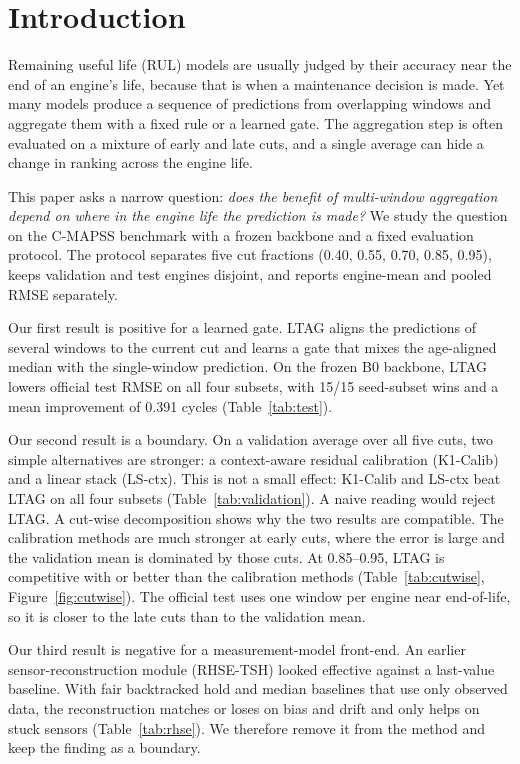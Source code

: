 \section{Introduction}
\label{sec:intro}

Remaining useful life (RUL) models are usually judged by their accuracy near the
end of an engine's life, because that is when a maintenance decision is made.
Yet many models produce a sequence of predictions from overlapping windows and
aggregate them with a fixed rule or a learned gate. The aggregation step is often
evaluated on a mixture of early and late cuts, and a single average can hide a
change in ranking across the engine life.

This paper asks a narrow question: \emph{does the benefit of multi-window
aggregation depend on where in the engine life the prediction is made?} We study
the question on the C-MAPSS benchmark \cite{saxena2008} with a frozen backbone and
a fixed evaluation protocol. The protocol separates five cut fractions
(0.40, 0.55, 0.70, 0.85, 0.95), keeps validation and test engines disjoint, and
reports engine-mean and pooled RMSE separately.

Our first result is positive for a learned gate. LTAG aligns the predictions of
several windows to the current cut and learns a gate that mixes the age-aligned
median with the single-window prediction. On the frozen B0 backbone, LTAG lowers
official test RMSE on all four subsets, with 15/15 seed-subset wins and a mean
improvement of 0.391 cycles (Table~\ref{tab:test}).

Our second result is a boundary. On a validation average over all five cuts, two
simple alternatives are stronger: a context-aware residual calibration
(K1-Calib) and a linear stack (LS-ctx). This is not a small effect: K1-Calib and
LS-ctx beat LTAG on all four subsets (Table~\ref{tab:validation}). A naive reading
would reject LTAG. A cut-wise decomposition shows why the two results are
compatible. The calibration methods are much stronger at early cuts, where the
error is large and the validation mean is dominated by those cuts. At 0.85--0.95,
LTAG is competitive with or better than the calibration methods
(Table~\ref{tab:cutwise}, Figure~\ref{fig:cutwise}). The official test uses one
window per engine near end-of-life, so it is closer to the late cuts than to the
validation mean.

Our third result is negative for a measurement-model front-end. An earlier
sensor-reconstruction module (RHSE-TSH) looked effective against a last-value
baseline. With fair backtracked hold and median baselines that use only observed
data, the reconstruction matches or loses on bias and drift and only helps on
stuck sensors (Table~\ref{tab:rhse}). We therefore remove it from the method and
keep the finding as a boundary.

